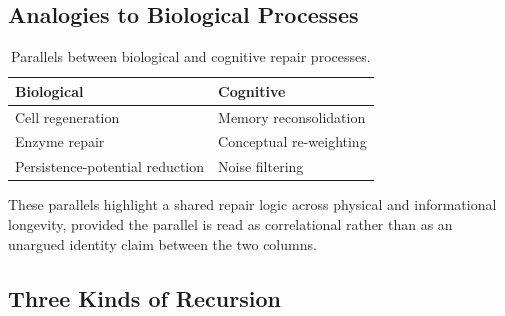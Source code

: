 \documentclass[12pt]{article}
\begin{document}
\subsection{Analogies to Biological Processes}

\begin{table}[h]
\centering
\begin{tabular}{ll}
\toprule
\textbf{Biological} & \textbf{Cognitive} \\
\midrule
Cell regeneration & Memory reconsolidation \\
Enzyme repair & Conceptual re-weighting \\
Persistence-potential reduction & Noise filtering \\
\bottomrule
\end{tabular}
\caption{Parallels between biological and cognitive repair processes.}
\label{tab:analogies}
\end{table}

These parallels highlight a shared repair logic across physical and informational longevity, provided the parallel is read as correlational rather than as an unargued identity claim between the two columns.

\subsection{Three Kinds of Recursion}
\end{document}
